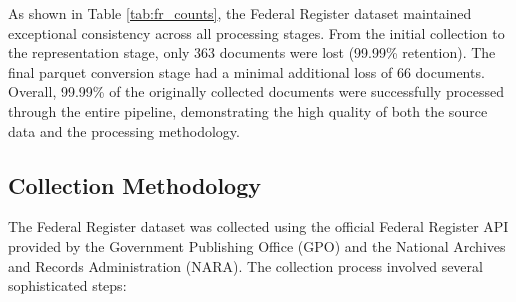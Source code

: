 As shown in Table \ref{tab:fr_counts}, the Federal Register dataset maintained exceptional consistency across all processing stages. From the initial collection to the representation stage, only 363 documents were lost (99.99\% retention). The final parquet conversion stage had a minimal additional loss of 66 documents. Overall, 99.99\% of the originally collected documents were successfully processed through the entire pipeline, demonstrating the high quality of both the source data and the processing methodology.

\subsection{Collection Methodology}

The Federal Register dataset was collected using the official Federal Register API provided by the Government Publishing Office (GPO) and the National Archives and Records Administration (NARA). The collection process involved several sophisticated steps:

